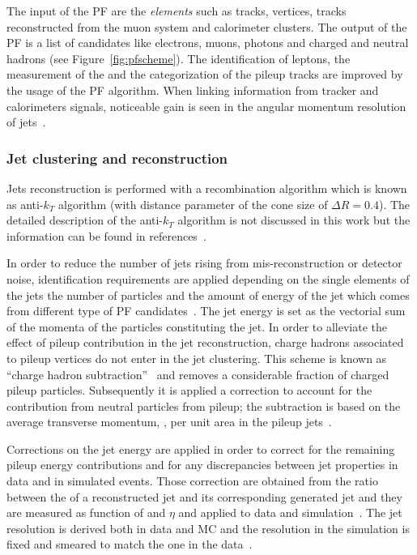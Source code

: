 The input of the PF are the \emph{elements} such as tracks, vertices, tracks
reconstructed from the muon system and
calorimeter clusters. The output of the PF is a list of candidates
like electrons, muons, photons and charged and neutral hadrons (see
Figure~\ref{fig:pfscheme}). The identification of leptons, the
measurement of the \ptmiss and the categorization of the pileup tracks
are improved by the usage of the PF algorithm. When linking
information from tracker and calorimeters signals, noticeable gain is seen
in the angular momentum resolution of jets~\cite{CMS:particleflow}.

\subsubsection{Jet clustering and reconstruction}\label{sec:jetclustering}
Jets reconstruction is performed with a recombination algorithm which
is known as anti-$k_T$ algorithm (with distance parameter of the cone size
of $\Delta R = 0.4$). The detailed description of the anti-$k_T$ algorithm is not
discussed in this work but the information can be found in 
references~\cite{Cacciari_2008,Cacciari_2012}.

In order to reduce the number of jets rising from mis-reconstruction or
detector noise, identification requirements are applied depending on the single elements of the
jets \ie the number of particles and the amount of energy of the
jet which comes from different type of PF candidates~\cite{CMS-PAS-JME-16-003}.
The jet energy is set as the vectorial sum of the momenta of the
particles constituting the jet. In order to alleviate the effect of
pileup contribution in the jet reconstruction, charge hadrons
associated to pileup vertices do not enter in the jet clustering. This
scheme is known as ``charge hadron
subtraction''~\cite{CMS-PAS-JME-14-001} and removes a
considerable fraction of charged pileup particles.  
Subsequently it is applied a correction to account for the
contribution from neutral particles from pileup; the subtraction is
based on the average transverse momentum, \pt, per unit area in the
pileup jets~\cite{CACCIARI2008119, Cacciari_2008_area,
  Sirunyan:2020foa}.

Corrections on the jet energy are applied in order to correct for the
remaining pileup energy contributions and for any discrepancies
between jet properties in data and in simulated events. Those
correction are obtained from the ratio between the \pt of a
reconstructed jet and its corresponding generated jet and they are
measured as function of \pt and $\eta$ and applied to data and
simulation~\cite{Khachatryan_2017}. The jet \pt resolution is
derived both in data and MC and the resolution in the simulation is
fixed and smeared to match the one in the
data~\cite{Khachatryan_2017}.

